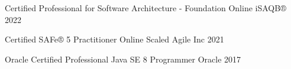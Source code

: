 

\begin{cvhonors}

  \cvhonor
    {Certified Professional for Software Architecture - Foundation} %
    {Online} %
    {iSAQB®} %
    {2022} %
    
  \cvhonor
    {Certified SAFe® 5 Practitioner} %
    {Online} %
    {Scaled Agile Inc} %
    {2021} %

  \cvhonor
    {Oracle Certified Professional} %
    {Java SE 8 Programmer} %
    {Oracle} %
    {2017} %

\end{cvhonors}
